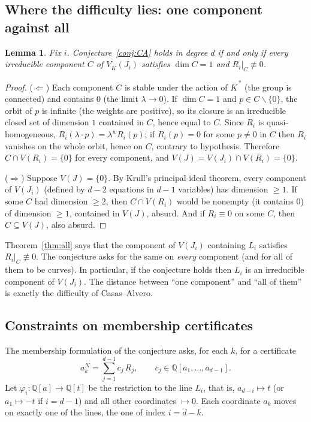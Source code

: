 \documentclass[11pt,reqno]{amsart}
\theoremstyle{plain}
\newtheorem{lemma}[theorem]{Lemma}
\theoremstyle{definition}
\newcommand{\KK}{\overline{K}}
\begin{document}
\subsection{Where the difficulty lies: one component against all}

\begin{lemma}\label{lem:components}
Fix $i$. Conjecture~\ref{conj:CA} holds in degree $d$ if and only if every
irreducible component $C$ of $V_{\KK}(J_i)$ satisfies $\dim C=1$ and
$R_i|_C\not\equiv0$.
\end{lemma}

\begin{proof}
($\Leftarrow$) Each component $C$ is stable under the action of $\KK^{\,*}$ (the
group is connected) and contains $0$ (the limit $\lambda\to0$). If $\dim C=1$ and
$p\in C\smallsetminus\{0\}$, the orbit of $p$ is infinite (the weights are
positive), so its closure is an irreducible closed set of dimension $1$ contained
in $C$, hence equal to $C$. Since $R_i$ is quasi-homogeneous,
$R_i(\lambda\cdot p)=\lambda^wR_i(p)$; if $R_i(p)=0$ for some $p\neq0$ in $C$
then $R_i$ vanishes on the whole orbit, hence on $C$, contrary to hypothesis.
Therefore $C\cap V(R_i)=\{0\}$ for every component, and
$V(J)=V(J_i)\cap V(R_i)=\{0\}$.

($\Rightarrow$) Suppose $V(J)=\{0\}$. By Krull's principal ideal theorem, every
component of $V(J_i)$ (defined by $d-2$ equations in $d-1$ variables) has
dimension $\ge1$. If some $C$ had dimension $\ge2$, then $C\cap V(R_i)$ would be
nonempty (it contains $0$) of dimension $\ge1$, contained in $V(J)$, absurd. And
if $R_i\equiv0$ on some $C$, then $C\subseteq V(J)$, also absurd.
\end{proof}

Theorem~\ref{thm:all} says that the component of $V(J_i)$ containing $L_i$
satisfies $R_i|_C\not\equiv0$. The conjecture asks for the same on \emph{every}
component (and for all of them to be curves). In particular, if the conjecture
holds then $L_i$ is an irreducible component of $V(J_i)$. The distance between
``one component'' and ``all of them'' is exactly the difficulty of
Casas--Alvero.

\subsection{Constraints on membership certificates}

The membership formulation of the conjecture asks, for each $k$, for a
certificate
\begin{equation}\label{eq:cert}
  a_k^N=\sum_{j=1}^{d-1}c_j\,R_j,\qquad c_j\in\mathbb{Q}[a_1,\dots,a_{d-1}].
\end{equation}
Let $\varphi_i:\mathbb{Q}[a]\to\mathbb{Q}[t]$ be the restriction to the line
$L_i$, that is, $a_{d-i}\mapsto t$ (or $a_1\mapsto-t$ if $i=d-1$) and all other
coordinates $\mapsto0$. Each coordinate $a_k$ moves on exactly one of the lines,
the one of index $i=d-k$.
\end{document}
